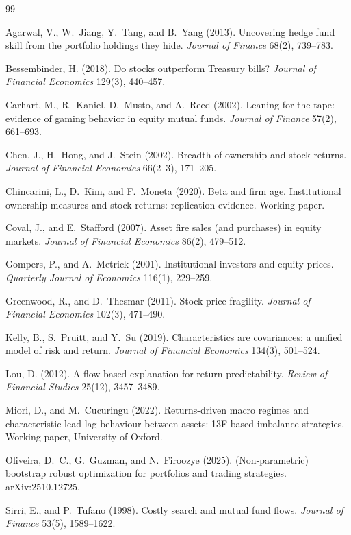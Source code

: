\begin{thebibliography}{99}

Agarwal, V., W.~Jiang, Y.~Tang, and B.~Yang (2013).
Uncovering hedge fund skill from the portfolio holdings they hide.
\emph{Journal of Finance} 68(2), 739--783.

Bessembinder, H. (2018).
Do stocks outperform Treasury bills?
\emph{Journal of Financial Economics} 129(3), 440--457.

Carhart, M., R.~Kaniel, D.~Musto, and A.~Reed (2002).
Leaning for the tape: evidence of gaming behavior in equity mutual
funds. \emph{Journal of Finance} 57(2), 661--693.

Chen, J., H.~Hong, and J.~Stein (2002).
Breadth of ownership and stock returns.
\emph{Journal of Financial Economics} 66(2--3), 171--205.

Chincarini, L., D.~Kim, and F.~Moneta (2020).
Beta and firm age. Institutional ownership measures and stock
returns: replication evidence. Working paper.

Coval, J., and E.~Stafford (2007).
Asset fire sales (and purchases) in equity markets.
\emph{Journal of Financial Economics} 86(2), 479--512.

Gompers, P., and A.~Metrick (2001).
Institutional investors and equity prices.
\emph{Quarterly Journal of Economics} 116(1), 229--259.

Greenwood, R., and D.~Thesmar (2011).
Stock price fragility.
\emph{Journal of Financial Economics} 102(3), 471--490.

Kelly, B., S.~Pruitt, and Y.~Su (2019).
Characteristics are covariances: a unified model of risk and return.
\emph{Journal of Financial Economics} 134(3), 501--524.

Lou, D. (2012).
A flow-based explanation for return predictability.
\emph{Review of Financial Studies} 25(12), 3457--3489.

Miori, D., and M.~Cucuringu (2022).
Returns-driven macro regimes and characteristic lead-lag behaviour
between assets: 13F-based imbalance strategies. Working paper,
University of Oxford.

Oliveira, D.~C., G.~Guzman, and N.~Firoozye (2025).
(Non-parametric) bootstrap robust optimization for portfolios and
trading strategies. arXiv:2510.12725.

Sirri, E., and P.~Tufano (1998).
Costly search and mutual fund flows.
\emph{Journal of Finance} 53(5), 1589--1622.

\end{thebibliography}
